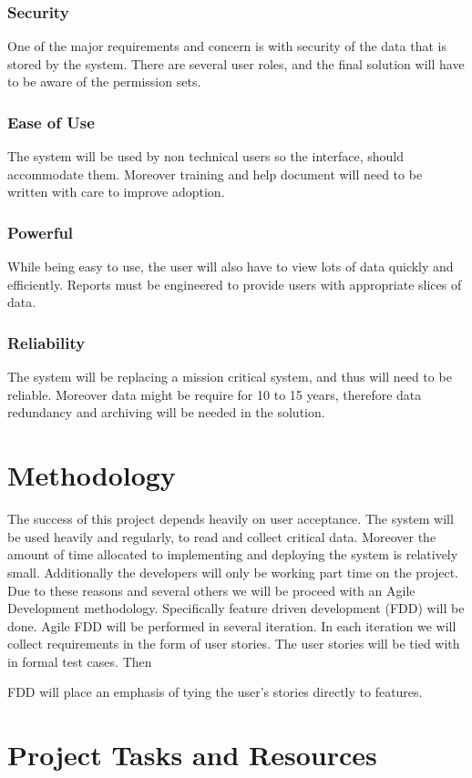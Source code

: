 \documentclass{journal}
\begin{document}
\subsubsection{Security}
One of the major requirements and concern is with security of the data that is stored by the system. There are several user roles, and the final solution will have to be aware of the permission sets. 
\subsubsection{ Ease of Use }
The system will be used by non technical users so the interface, should accommodate them. Moreover training and help document will need to be written with care to improve adoption. 
\subsubsection{ Powerful }
While being easy to use, the user will also have to view lots of data quickly and efficiently. Reports must be engineered to provide users with appropriate slices of data. 
\subsubsection{ Reliability }
The system will be replacing a mission critical system, and thus will need to be reliable. Moreover data might be require for 10 to 15 years, therefore data redundancy and archiving will be needed in the solution. 
\section{Methodology}

The success of this project depends heavily on user acceptance. The system will be used heavily and regularly, to read and collect critical data. Moreover the amount of time allocated to implementing and deploying 
the system is relatively small. Additionally the developers will only be working part time on the project. Due to these reasons and several others we will be proceed with an Agile Development methodology. Specifically
feature driven development (FDD) will be done. Agile FDD will be performed in several iteration. In each iteration we will collect requirements in the form of user stories. The user stories will be tied with 
in formal test cases. Then 

FDD will place an emphasis of tying the user's stories directly to features. 

\section{Project Tasks and Resources}
\end{document}
